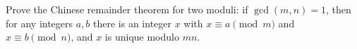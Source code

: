 Prove the Chinese remainder theorem for two moduli: if $\gcd(m,n)=1$, then for any integers $a,b$ there is an integer $x$ with $x\equiv a\pmod m$ and $x\equiv b\pmod n$, and $x$ is unique modulo $mn$.

